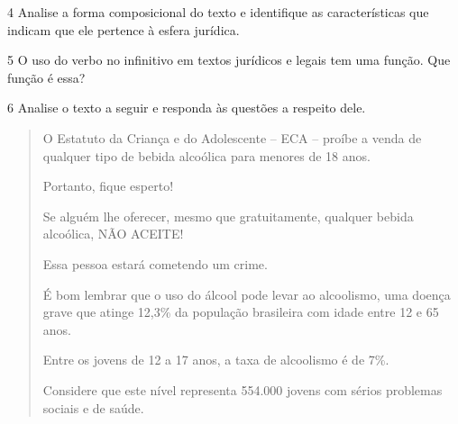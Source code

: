 {\begin{quote}
\end{quote}


\num{4} Analise a forma composicional do texto e identifique as características que
indicam que ele pertence à esfera jurídica.


\num{5} O uso do verbo no infinitivo em textos jurídicos e legais tem uma função. 
Que função é essa?


\num{6} Analise o texto a seguir e responda às questões a respeito dele. 


\begin{quote}
O Estatuto da Criança e do Adolescente -- ECA -- proíbe a venda de
qualquer tipo de bebida alcoólica para menores de 18 anos.

Portanto, fique esperto!

Se alguém lhe oferecer, mesmo que gratuitamente, qualquer bebida
alcoólica, NÃO ACEITE!

Essa pessoa estará cometendo um crime.

É bom lembrar que o uso do álcool pode levar ao alcoolismo, uma doença
grave que atinge 12,3\% da população brasileira com idade entre 12 e 65
anos.

Entre os jovens de 12 a 17 anos, a taxa de alcoolismo é de 7\%.

Considere que este nível representa 554.000 jovens com sérios problemas
sociais e de saúde.


\end{quote}}
